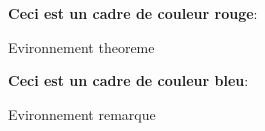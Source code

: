 \begin{ombretheo}
  \begin{theo}
    \textbf{Ceci est un cadre de couleur rouge}:\bigskip

    Evironnement theoreme
  \end{theo}
\end{ombretheo}



\begin{ombreremarque}
  \begin{remarque}
    \textbf{Ceci est un cadre de couleur bleu}:\bigskip

    Evironnement remarque
  \end{remarque}
\end{ombreremarque}

